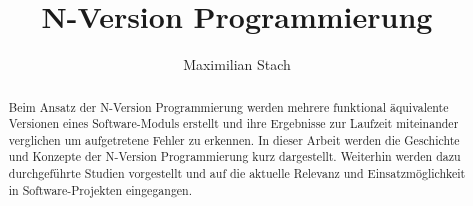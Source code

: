 \title{N-Version Programmierung}



\author{Maximilian Stach}
%




\maketitle


\begin{abstract}
Beim Ansatz der N-Version Programmierung werden mehrere funktional äquivalente Versionen eines Software-Moduls erstellt und ihre Ergebnisse zur Laufzeit miteinander verglichen um aufgetretene Fehler zu erkennen.
In dieser Arbeit werden die Geschichte und Konzepte der N-Version Programmierung kurz dargestellt. Weiterhin werden dazu durchgeführte Studien vorgestellt und auf die aktuelle Relevanz und Einsatzmöglichkeit in Software-Projekten eingegangen.


\end{abstract}
